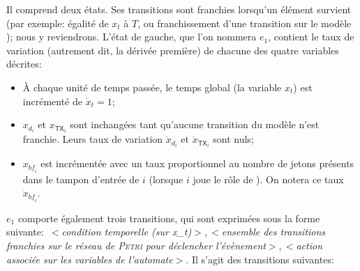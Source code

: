 Il comprend deux états.
Ses transitions sont franchies lorsqu'un élément survient (par exemple: égalité de $x_t$ à $T$, ou franchissement d'une transition sur le modèle \rpsge); nous y reviendrons.
L'état de gauche, que l'on nommera $e_1$, contient le taux de variation (autrement dit, la dérivée première) de chacune des quatre variables décrites:
\begin{itemize}
    \item À chaque unité de temps passée, le temps global (la variable $x_t$) est incrémenté de $\dot{x}_t=1$;
    \item $x_{d_i}$ et $x_{\mathsf{TX}_i}$ sont inchangées tant qu'aucune transition du modèle \rpsge n'est franchie.
        Leurs taux de variation $\dot{x}_{d_i}$ et $\dot{x}_{\mathsf{TX}_i}$ sont nuls;
    \item $x_{\mathit{bf}_i}$ est incrémentée avec un taux proportionnel au nombre de jetons présents dans le tampon d'entrée de $i$ (lorsque $i$ joue le rôle de \cn).
        On notera ce taux~$\dot{x}_{\mathit{bf}_i}$.
\end{itemize}
$e_1$ comporte également trois transitions, qui sont exprimées sous la forme suivante:\ $<$\textit{condition temporelle (sur x\_t)}$>, <$\textit{ensemble des transitions franchies sur le réseau de \textsc{Petri} pour déclencher l'évènement}$>, <$\textit{action associée sur les variables de l'automate}$>$.
Il s'agit des transitions suivantes:
